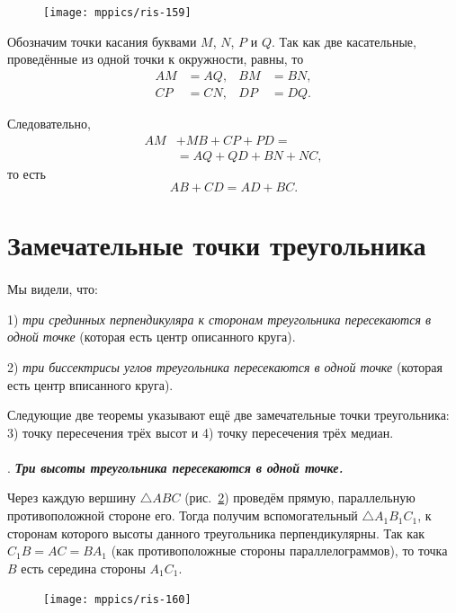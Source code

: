 \documentclass[oneside]{book}
\begin{document}
\begin{figure}
\centering
\texttt{[image: mppics/ris-159]}
\caption{}\label{1938/ris-159}
\end{figure}

Обозначим точки касания буквами $M$, $N$, $P$ и $Q$.
Так как две касательные, проведённые из одной точки к окружности, равны, то 
\begin{align*}
AM&=AQ,& BM&=BN,
\\
CP&=CN, & DP &= DQ.
\end{align*}

Следовательно,
\begin{align*}
AM&+MB+CP+PD = 
\\
&=AQ + QD+BN+NC,
\end{align*}
то есть 
\[AB+CD=AD+BC.\]


\section{Замечательные точки треугольника}

\paragraph{}\label{1938/141}
Мы видели, что:

1) \emph{три срединных перпендикуляра к сторонам треугольника пересекаются в одной точке} (которая есть центр описанного круга). 

2) \emph{три биссектрисы углов треугольника пересекаются в одной точке} (которая есть центр вписанного круга).

Следующие две теоремы указывают ещё две замечательные точки треугольника:
3) точку пересечения трёх высот и 4) точку пересечения трёх медиан.

\paragraph{}\label{1938/142}
.
\textbf{\emph{Три высоты треугольника пересекаются в одной точке.}}

Через каждую вершину $\triangle ABC$ (рис.~\ref{1938/ris-160}) проведём прямую, параллельную противоположной стороне его.
Тогда получим вспомогательный $\triangle A_1B_1C_1$, к сторонам которого высоты данного треугольника перпендикулярны.
Так как $C_1B=AC=BA_1$ (как противоположные стороны параллелограммов), то точка $B$ есть середина стороны $A_1C_1$.

\begin{figure}
\centering
\texttt{[image: mppics/ris-160]}
\caption{}\label{1938/ris-160}
\end{figure}
\end{document}
